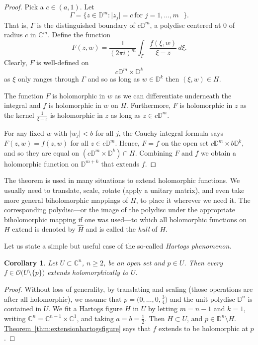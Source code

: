 \documentclass[12pt,openany]{book}
\newcommand{\sabs}[1]{\lvert {#1} \rvert}
\newcommand{\C}{{\mathbb{C}}}
\newcommand{\D}{{\mathbb{D}}}
\newcommand{\sO}{{\mathscr{O}}}
\newcommand{\myindex}[1]{#1\index{#1}}
\theoremstyle{plain}
\newtheorem{cor}[thm]{Corollary}
\theoremstyle{remark}
\theoremstyle{definition}
\theoremstyle{exercise}
\theoremstyle{example}
\newcommand{\thmref}[1]{\hyperref[#1]{Theorem~\ref*{#1}}}
\begin{document}
\begin{proof}
Pick a $c \in (a,1)$.  Let
\begin{equation*}
\Gamma =
\bigl\{ z \in \D^{m} : \sabs{z_j} = c ~\text{for $j=1,\ldots,m$ } \bigr\}.
\end{equation*}
That is, $\Gamma$ is the distinguished boundary of $c \D^m$,
a polydisc centered at 0 of radius $c$ in $\C^m$.
Define the function
\begin{equation*}
F(z,w)
=
\frac{1}{{(2\pi i)}^m}
\int_\Gamma \frac{f(\xi,w)}{\xi-z} \, d\xi .
\end{equation*}
Clearly, $F$ is well-defined on
\begin{equation*}
c\D^m \times \D^k
\end{equation*}
as $\xi$ only
ranges through $\Gamma$ and so as long as $w \in \D^k$ then $(\xi,w) \in H$.

The function $F$ is holomorphic in $w$ as we can differentiate
underneath the integral and $f$ is holomorphic in $w$ on $H$.  Furthermore,
$F$ is holomorphic in $z$ as the kernel $\frac{1}{\xi-z}$ is holomorphic in
$z$ as long as $z \in c\D^m$.

For any fixed $w$ with $\sabs{w_j} < b$ for all $j$,
the Cauchy integral formula says
$F(z,w) = f(z,w)$ for all $z \in c \D^m$.
Hence, $F=f$ on the open set
$c\D^m \times b\D^k$,
and so they are equal on 
$(c\D^m \times \D^k) \cap H$.
Combining $F$ and $f$ we obtain a holomorphic
function on $\D^{m+k}$ that extends $f$.
\end{proof}

The theorem is used 
in many situations to extend holomorphic functions.
We usually need to
translate, scale, 
rotate (apply a unitary matrix),
and even take more general biholomorphic mappings
of $H$, to place it wherever we need it.  The corresponding polydisc---or the image of
the polydisc under the appropriate biholomorphic mapping if one was
used---to which all holomorphic functions on $H$ extend is denoted
by $\widehat{H}$ and is called the \emph{hull} of $H$.%

Let us state a simple but useful case of the so-called
\emph{\myindex{Hartogs phenomenon}}.

\begin{cor}
Let $U \subset \C^n$, $n \geq 2$, be an open set and $p \in U$.
Then every $f \in \sO\bigl(U \setminus \{ p \} \bigr)$
extends holomorphically to $U$.
\end{cor}

\begin{proof}
Without loss of generality,
by translating and scaling (those operations are after all holomorphic),
we assume that $p = \bigl(0,\ldots,0,\frac{3}{4}\bigr)$
and the unit polydisc $\D^n$ is contained in $U$.  We fit a Hartogs figure $H$
in $U$
by letting $m=n-1$ and $k=1$, writing $\C^n = \C^{n-1} \times \C^{1}$,
and taking $a = b = \frac{1}{2}$.
Then $H \subset U$, and $p \in \D^n \setminus H$.
\thmref{thm:extensionhartogsfigure} says that
$f$ extends to be holomorphic at $p$.
\end{proof}
\end{document}
